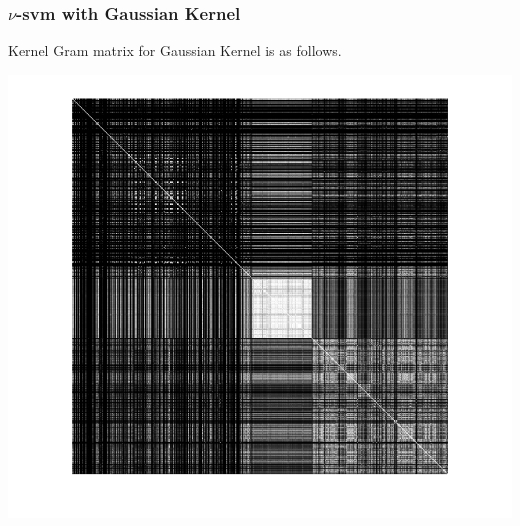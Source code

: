 \documentclass{article}
\begin{document}
\subsubsection{$\nu$-svm with Gaussian Kernel}
Kernel Gram matrix for Gaussian Kernel is as follows.
\begin{center}
\includegraphics[scale=.6]{Classification/2/nu_g/kgm}
\end{center}
\end{document}
